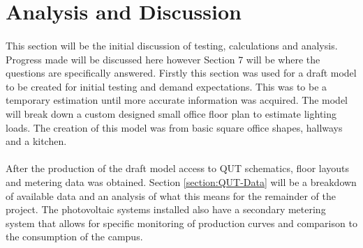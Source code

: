 
\section{Analysis and Discussion}

\paragraph{}
This section will be the initial discussion of testing, calculations and analysis. Progress made will be discussed here however Section 7 will be where the questions are specifically answered. Firstly this section was used for a draft model to be created for initial testing and demand expectations. This was to be a temporary estimation until more accurate information was acquired. The model will break down a custom designed small office floor plan to estimate lighting loads. The creation of this model was from basic square office shapes, hallways and a kitchen. 

\paragraph{}
After the production of the draft model access to QUT schematics, floor layouts and metering data was obtained. Section \ref{section:QUT-Data} will be a breakdown of available data and an analysis of what this means for the remainder of the project. The photovoltaic systems installed also have a secondary metering system that allows for specific monitoring of production curves and comparison to the consumption of the campus.  